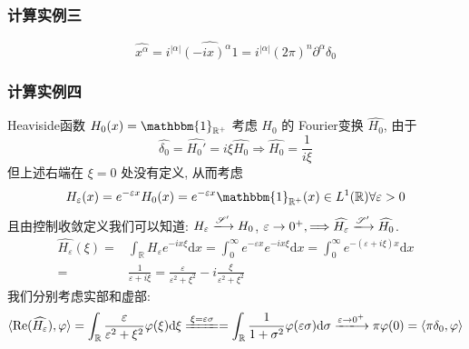 \documentclass[11pt]{ctexart}[UTF8]
\begin{document}
\subsubsection*{计算实例三}
\begin{equation*}
    \widehat{x^{\alpha}} = i^{|\alpha|} \widehat{(-ix)^{\alpha}1} = i^{|\alpha|} (2\pi)^n \partial^{\alpha}\delta_{0}
\end{equation*}
\subsubsection*{计算实例四}
Heaviside函数 $H_{0}(x) = \mathbbm{1}_{\mathbb{R^{+}}}$ 考虑 $H_{0}$ 的 Fourier变换 $\widehat{H_{0}}$, 由于
\begin{equation*}
    \widehat{\delta_{0}} = \widehat{H_{0}'} = i\xi \widehat{H_{0}} \Longrightarrow \widehat{H_{0}} = \frac{1}{i\xi}
\end{equation*}
但上述右端在 $\xi = 0$ 处没有定义, 从而考虑
\begin{equation*}
    H_{\varepsilon}(x) = e^{-\varepsilon x} H_{0}(x) = e^{-\varepsilon x} \mathbbm{1}_{\mathbb{R}^{+}}(x) \in L^1(\mathbb{R}) \forall \varepsilon > 0
\end{equation*}
且由控制收敛定义我们可以知道: $H_{\varepsilon} \xlongrightarrow{\mathscr{S}'} H_{0}$, $\varepsilon \to 0^+, \Longrightarrow \widehat{H_{\varepsilon}} \xlongrightarrow{\mathscr{S}'} \widehat{H_{0}}$.
\begin{equation*}
    \begin{aligned}
            \widehat{H_{\varepsilon}}(\xi) = & \int_{\mathbb{R}}H_{\varepsilon} e^{-i x \xi} \mathrm{d}x = \int_{0}^{\infty} e^{-\varepsilon x} e^{-i x \xi} \mathrm{d}x = \int_{0}^{\infty} e^{-(\varepsilon + i\xi)x} \mathrm{d}x \\
            = & \frac{1}{\varepsilon + i\xi} = \frac{\varepsilon}{\varepsilon^2 + \xi^2} - i \frac{\xi}{\varepsilon^2 + \xi^2}
    \end{aligned}
\end{equation*}
我们分别考虑实部和虚部:
\begin{equation*}
    \langle \operatorname{Re}(\widehat{H_{\varepsilon}}), \varphi \rangle = \int_{\mathbb{R}} \frac{\varepsilon}{\varepsilon^2 + \xi^2} \varphi(\xi) \mathrm{d}\xi \xlongequal{\xi = \varepsilon\sigma} = \int_{\mathbb{R}} \frac{1}{1 + \sigma^2} \varphi(\varepsilon\sigma) \mathrm{d}\sigma \xlongrightarrow{\varepsilon \to 0^+} \pi\varphi(0) = \langle \pi\delta_{0}, \varphi \rangle
\end{equation*}
\end{document}
